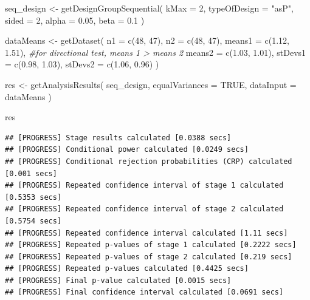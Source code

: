 \documentclass[
  oneside]{book}
\newenvironment{Shaded}{\begin{snugshade}}{\end{snugshade}}
\newcommand{\AttributeTok}[1]{\textcolor[rgb]{0.77,0.63,0.00}{#1}}
\newcommand{\CommentTok}[1]{\textcolor[rgb]{0.56,0.35,0.01}{\textit{#1}}}
\newcommand{\ConstantTok}[1]{\textcolor[rgb]{0.00,0.00,0.00}{#1}}
\newcommand{\DecValTok}[1]{\textcolor[rgb]{0.00,0.00,0.81}{#1}}
\newcommand{\FloatTok}[1]{\textcolor[rgb]{0.00,0.00,0.81}{#1}}
\newcommand{\FunctionTok}[1]{\textcolor[rgb]{0.00,0.00,0.00}{#1}}
\newcommand{\NormalTok}[1]{#1}
\newcommand{\OtherTok}[1]{\textcolor[rgb]{0.56,0.35,0.01}{#1}}
\newcommand{\StringTok}[1]{\textcolor[rgb]{0.31,0.60,0.02}{#1}}
\begin{document}
\begin{Shaded}
\begin{Highlighting}[]
\NormalTok{seq\_design }\OtherTok{\textless{}{-}} \FunctionTok{getDesignGroupSequential}\NormalTok{(}
  \AttributeTok{kMax =} \DecValTok{2}\NormalTok{,}
  \AttributeTok{typeOfDesign =} \StringTok{"asP"}\NormalTok{,}
  \AttributeTok{sided =} \DecValTok{2}\NormalTok{,}
  \AttributeTok{alpha =} \FloatTok{0.05}\NormalTok{,}
  \AttributeTok{beta =} \FloatTok{0.1}
\NormalTok{)}

\NormalTok{dataMeans }\OtherTok{\textless{}{-}} \FunctionTok{getDataset}\NormalTok{(}
  \AttributeTok{n1 =} \FunctionTok{c}\NormalTok{(}\DecValTok{48}\NormalTok{, }\DecValTok{47}\NormalTok{), }
  \AttributeTok{n2 =} \FunctionTok{c}\NormalTok{(}\DecValTok{48}\NormalTok{, }\DecValTok{47}\NormalTok{), }
  \AttributeTok{means1 =} \FunctionTok{c}\NormalTok{(}\FloatTok{1.12}\NormalTok{, }\FloatTok{1.51}\NormalTok{), }\CommentTok{\#for directional test, means 1 \textgreater{} means 2}
  \AttributeTok{means2 =} \FunctionTok{c}\NormalTok{(}\FloatTok{1.03}\NormalTok{, }\FloatTok{1.01}\NormalTok{),}
  \AttributeTok{stDevs1 =} \FunctionTok{c}\NormalTok{(}\FloatTok{0.98}\NormalTok{, }\FloatTok{1.03}\NormalTok{), }
  \AttributeTok{stDevs2 =} \FunctionTok{c}\NormalTok{(}\FloatTok{1.06}\NormalTok{, }\FloatTok{0.96}\NormalTok{)}
\NormalTok{  )}

\NormalTok{res }\OtherTok{\textless{}{-}} \FunctionTok{getAnalysisResults}\NormalTok{(}
\NormalTok{  seq\_design, }
  \AttributeTok{equalVariances =} \ConstantTok{TRUE}\NormalTok{,}
  \AttributeTok{dataInput =}\NormalTok{ dataMeans}
\NormalTok{  )}

\NormalTok{res}
\end{Highlighting}
\end{Shaded}

\begin{verbatim}
## [PROGRESS] Stage results calculated [0.0388 secs] 
## [PROGRESS] Conditional power calculated [0.0249 secs] 
## [PROGRESS] Conditional rejection probabilities (CRP) calculated [0.001 secs] 
## [PROGRESS] Repeated confidence interval of stage 1 calculated [0.5353 secs] 
## [PROGRESS] Repeated confidence interval of stage 2 calculated [0.5754 secs] 
## [PROGRESS] Repeated confidence interval calculated [1.11 secs] 
## [PROGRESS] Repeated p-values of stage 1 calculated [0.2222 secs] 
## [PROGRESS] Repeated p-values of stage 2 calculated [0.219 secs] 
## [PROGRESS] Repeated p-values calculated [0.4425 secs] 
## [PROGRESS] Final p-value calculated [0.0015 secs] 
## [PROGRESS] Final confidence interval calculated [0.0691 secs]
\end{verbatim}
\end{document}
